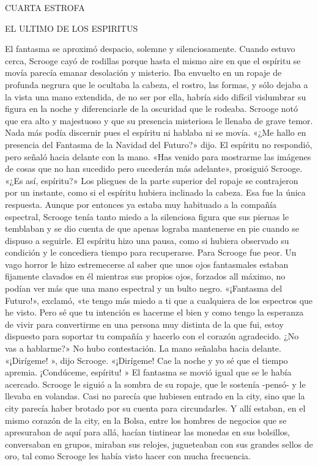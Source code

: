 \documentclass{novela}
\begin{document}
 CUARTA ESTROFA


 EL ULTIMO DE LOS ESPIRITUS


 El fantasma se aproximó despacio, solemne y silenciosamente. Cuando estuvo cerca, Scrooge cayó de rodillas porque hasta el mismo aire en que el espíritu se movía parecía emanar desolación y misterio.
 Iba envuelto en un ropaje de profunda negrura que le ocultaba la cabeza, el rostro, las formas, y sólo dejaba a la vista una mano extendida, de no ser por ella, habría sido difícil vislumbrar su figura en la noche y diferenciarle de la oscuridad que le rodeaba.
 Scrooge notó que era alto y majestuoso y que su presencia misteriosa le llenaba de grave temor. Nada más podía discernir pues el espíritu ni hablaba ni se movía.
 «¿Me hallo en presencia del Fantasma de la Navidad del Futuro?» dijo.
 El espíritu no respondió, pero señaló hacia delante con la mano.
 «Has venido para mostrarme las imágenes de cosas que no han sucedido pero sucederán más adelante», prosiguió Scrooge. «¿Es así, espíritu?»
 Los pliegues de la parte superior del ropaje se contrajeron por un instante, como si el espíritu hubiera inclinado la cabeza. Esa fue la única respuesta.
 Aunque por entonces ya estaba muy habituado a la compañía espectral, Scrooge tenía tanto miedo a la silenciosa figura que sus piernas le temblaban y se dio cuenta de que apenas lograba mantenerse en pie cuando se dispuso a seguirle. El espíritu hizo una pausa, como si hubiera observado su condición y le concediera tiempo para recuperarse.
 Para Scrooge fue peor. Un vago horror le hizo estremecerse al saber que unos ojos fantasmales estaban fijamente clavados en él mientras sus propios ojos, forzados all máximo, no podían ver más que una mano espectral y un bulto negro.
 «¡Fantasma del Futuro!», exclamó, «te tengo más miedo a ti que a cualquiera de los espectros que he visto. Pero sé que tu intención es hacerme el bien y como tengo la esperanza de vivir para convertirme en una persona muy distinta de la que fui, estoy dispuesto para soportar tu compañía y hacerlo con el corazón agradecido. ¿No vas a hablarme?»
 No hubo contestación. La mano señalaba hacia delante.
 «¡Dirígeme! », dijo Scrooge. «¡Dirígeme! Cae la noche y yo sé que el tiempo apremia. ¡Condúceme, espíritu! »
 El fantasma se movió igual que se le había acercado. Scrooge le siguió a la sombra de su ropaje, que le sostenía -pensó- y le llevaba en volandas.
 Casi no parecía que hubiesen entrado en la city, sino que la city parecía haber brotado por su cuenta para circundarles. Y allí estaban, en el mismo corazón de la city, en la Bolsa, entre los hombres de negocios que se apresuraban de aquí para allá, hacían tintinear las monedas en sus bolsillos, conversaban en grupos, miraban sus relojes, jugueteaban con sus grandes sellos de oro, tal como Scrooge les había visto hacer con mucha frecuencia.
\end{document}

